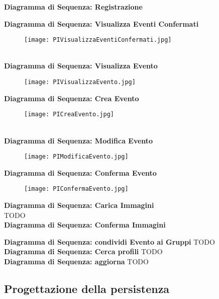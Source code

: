 \textbf{Diagramma di Sequenza: Registrazione}
\begin{figure}[h!]
    \centering
\end{figure}
\clearpage
\textbf{Diagramma di Sequenza: Visualizza Eventi Confermati}
\begin{figure}[h!]
    \centering
    \texttt{[image: PIVisualizzaEventiConfermati.jpg]}
\end{figure}\\
\textbf{Diagramma di Sequenza: Visualizza Evento}
\begin{figure}[h!]
    \centering
    \texttt{[image: PIVisualizzaEvento.jpg]}
\end{figure}
\clearpage
\textbf{Diagramma di Sequenza: Crea Evento}
\begin{figure}[h!]
    \centering
    \texttt{[image: PICreaEvento.jpg]}
\end{figure}\\
\textbf{Diagramma di Sequenza: Modifica Evento}
\begin{figure}[h!]
    \centering
    \texttt{[image: PIModificaEvento.jpg]}
\end{figure}
\clearpage
\textbf{Diagramma di Sequenza: Conferma Evento}
\begin{figure}[h!]
    \centering
    \texttt{[image: PIConfermaEvento.jpg]}
\end{figure}

\textbf{Diagramma di Sequenza: Carica Immagini}\\
TODO\\
\clearpage
\textbf{Diagramma di Sequenza: Conferma Immagini}
\begin{figure}[h!]
    \centering
\end{figure}

\clearpage

\textbf{Diagramma di Sequenza: condividi Evento ai Gruppi}
TODO\\
\textbf{Diagramma di Sequenza: Cerca profili}
TODO\\
\textbf{Diagramma di Sequenza: aggiorna}
TODO

\clearpage

\subsection{Progettazione della persistenza}

